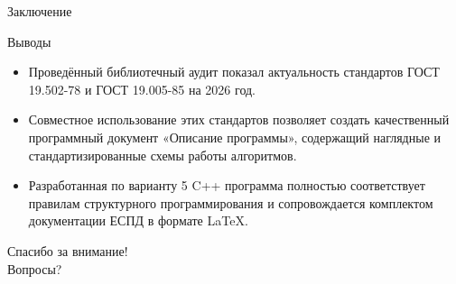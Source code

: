 \documentclass[utf8,russian]{beamer}
\begin{document}
\begin{frame}{Заключение}
  \begin{block}{Выводы}
    \begin{itemize}
      \item Проведённый библиотечный аудит показал актуальность стандартов ГОСТ 19.502-78 и ГОСТ 19.005-85 на 2026 год.
      \item Совместное использование этих стандартов позволяет создать качественный программный документ «Описание программы», содержащий наглядные и стандартизированные схемы работы алгоритмов.
      \item Разработанная по варианту 5 C++ программа полностью соответствует правилам структурного программирования и сопровождается комплектом документации ЕСПД в формате LaTeX.
    \end{itemize}
  \end{block}
  \vfill
  \begin{center}
    \Large Спасибо за внимание!\\
    \large Вопросы?
  \end{center}
\end{frame}
\end{document}
